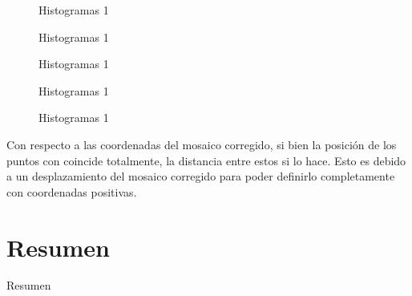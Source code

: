 \begin{figure}[H]
	\centering     %
	
	\hspace{1mm}%
	\hspace{1mm}%
	
	\caption[Histogramas 1]{Histogramas 1}
	\label{imagen:ec:SR_2}
\end{figure}

\begin{figure}[H]
	\centering     %
	\hspace{1mm}%
	\caption[Histogramas 1]{Histogramas 1}
	\label{imagen:ec:SR_3}
\end{figure}


\begin{figure}[H]
	\centering     %
	\hspace{1mm}%
	\hspace{1mm}%
	\caption[Histogramas 1]{Histogramas 1}
	\label{imagen:ec:0234_1}
\end{figure}

\begin{figure}[H]
	\centering     %
	
	\hspace{1mm}%
	\hspace{1mm}%
	
	\caption[Histogramas 1]{Histogramas 1}
	\label{imagen:ec:0234_2}
\end{figure}

\begin{figure}[h]
	\centering     %
	\hspace{1mm}%
	\caption[Histogramas 1]{Histogramas 1}
	\label{imagen:ec:0234_3}
\end{figure}

Con respecto a las coordenadas del mosaico corregido, si bien la posición de los puntos con coincide totalmente, la distancia entre estos si lo hace. Esto es debido a un desplazamiento del mosaico corregido para poder definirlo completamente con coordenadas positivas. 

\section{Resumen}
Resumen



